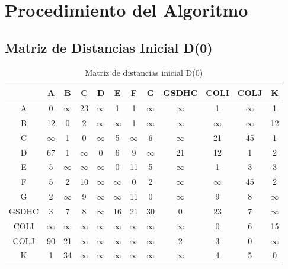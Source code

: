 \documentclass[12pt]{article}
\begin{document}
\clearpage
\section{Procedimiento del Algoritmo}
\subsection{Matriz de Distancias Inicial D(0)}
\begin{table}[h!]
\centering
\begin{tabular}{|c|c|c|c|c|c|c|c|c|c|c|c|}
\hline
 & A & B & C & D & E & F & G & GSDHC & COLI & COLJ & K \\\hline
A & 0 & $\infty$ & 23 & $\infty$ & 1 & 1 & $\infty$ & $\infty$ & 1 & $\infty$ & 1 \\\hline
B & 12 & 0 & 2 & $\infty$ & $\infty$ & 1 & $\infty$ & $\infty$ & $\infty$ & $\infty$ & 12 \\\hline
C & $\infty$ & 1 & 0 & $\infty$ & 5 & $\infty$ & 6 & $\infty$ & 21 & 45 & 1 \\\hline
D & 67 & 1 & $\infty$ & 0 & 6 & 9 & $\infty$ & 21 & 12 & 1 & 2 \\\hline
E & 5 & $\infty$ & $\infty$ & $\infty$ & 0 & 11 & 5 & $\infty$ & 1 & 3 & 3 \\\hline
F & 5 & 2 & 10 & $\infty$ & $\infty$ & 0 & 2 & $\infty$ & $\infty$ & 45 & 2 \\\hline
G & 2 & $\infty$ & 9 & $\infty$ & $\infty$ & 11 & 0 & $\infty$ & 9 & 8 & $\infty$ \\\hline
GSDHC & 3 & 7 & 8 & $\infty$ & 16 & 21 & 30 & 0 & 23 & 7 & $\infty$ \\\hline
COLI & $\infty$ & $\infty$ & $\infty$ & $\infty$ & $\infty$ & $\infty$ & $\infty$ & $\infty$ & 0 & 6 & 15 \\\hline
COLJ & 90 & 21 & $\infty$ & $\infty$ & $\infty$ & $\infty$ & $\infty$ & 2 & 3 & 0 & $\infty$ \\\hline
K & 1 & 34 & $\infty$ & $\infty$ & $\infty$ & $\infty$ & $\infty$ & $\infty$ & 4 & 5 & 0 \\\hline
\end{tabular}
\caption{Matriz de distancias inicial D(0)}
\end{table}

\clearpage
\end{document}
